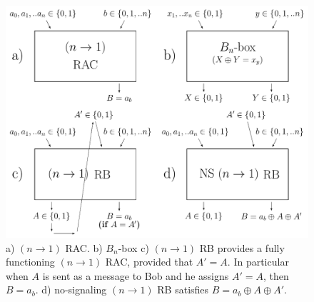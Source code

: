 \documentclass[%
 reprint,
 amsmath,amssymb,
 aps,
]{revtex4-1}
\begin{document}
\begin{figure}
\includegraphics[scale=0.5]{Def1.pdf}
\caption{  \label{fig1} a) $(n\rightarrow 1)$ RAC. b) $B_n$-box c) $(n\rightarrow 1)$ RB provides a fully functioning $(n\rightarrow 1)$ RAC, provided that $A'=A$. In particular when $A$ is sent as a message to Bob and he assigns $A'=A$, then $B=a_b$. d) no-signaling $(n\rightarrow 1)$ RB satisfies $B=a_b\oplus A \oplus A'$.}
\end{figure}
\end{document}
